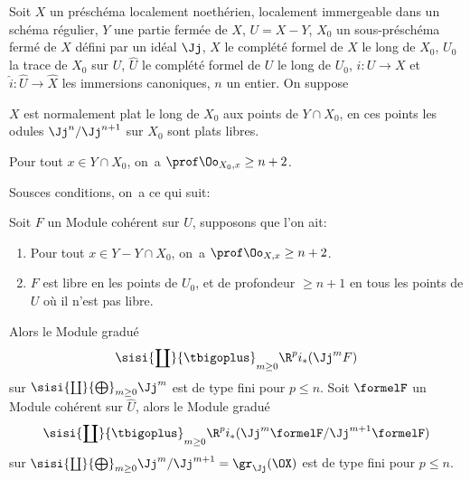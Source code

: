 \begin{theoreme} \label{XII.4.1} Soit $X$ un pr\'esch\'ema localement noeth\'erien, localement immergeable dans un sch\'ema r\'egulier, $Y$ une partie ferm\'ee de $X$, $U=X- Y$, $X_0$ un sous-pr\'esch\'ema ferm\'e de $X$ d\'efini par un id\'eal $\Jj$, $\widehat{X}$ le compl\'et\'e formel de $X$ le long de $X_0$, $U_0$ la trace de $X_0$ sur $U$, $\widehat{U}$ le compl\'et\'e formel de $U$ le long de $U_0$, $i:U\to X$ et $\widehat{i}:\widehat{U}\to \widehat{X}$ les immersions canoniques, $n$ un entier. On suppose
\begin{enumeratea}
\item
$X$ est normalement plat le long de $X_0$ aux points de $Y\cap X_0$, \ie en ces points les odules $\Jj^n/\Jj^{n+1}$ sur $X_0$ sont plats \ie {} libres.
\item
Pour tout $x\in Y\cap X_0$, on~a $\prof \Oo_{X_0, x}\geq n+2$.
\end{enumeratea}
Sous\pageoriginale ces conditions, on~a ce qui suit:
\begin{enumerate}
\sisi{\item[$1^\circ)$]}{\item} Soit $F$ un Module coh\'erent sur $U$, supposons que l'on ait:
\begin{enumerate}
\item[\textup{c)}] Pour tout $x\in Y- Y\cap X_0$, on~a $\prof \Oo_{X, x}\geq n+2$.

\item[\textup{d)}] $F$ est libre en les points de $U_0$, et de profondeur $\geq n+1$ en tous les points de $U$ o\`u il n'est pas libre.
\end{enumerate}
Alors le Module gradu\'e
\[
\sisi{\coprod}{\tbigoplus}_{m\geq 0}\R^pi_\ast(\Jj^mF)
\]
sur $\sisi{\coprod}{\bigoplus}_{m\geq 0}\Jj^m$ est de type fini pour $p\leq n$. \sisi{\item[$2^\circ$]}{\item} Soit $\formelF$ un Module coh\'erent sur $\widehat{U}$, alors le Module gradu\'e
\[
\sisi{\coprod}{\tbigoplus}_{m\geq 0}\R^pi_\ast(\Jj^m\formelF/\Jj^{m+1}\formelF)
\]
sur $\sisi{\coprod}{\bigoplus}_{m\geq 0}\Jj^m/\Jj^{m+1}=\gr_{\Jj}(\OX)$ est de type fini pour $p\leq n$.
\end{enumerate}
\end{theoreme}

